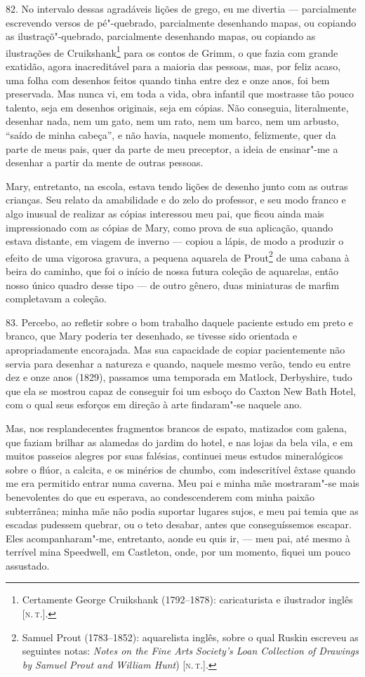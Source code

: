 82. No intervalo dessas agradáveis lições de grego, eu me divertia ---
parcialmente escrevendo versos de pé"-quebrado, parcialmente desenhando
mapas, ou copiando as ilustraçõ"-quebrado, parcialmente desenhando mapas,
ou copiando as
ilustrações
de Cruikshank\footnote{Certamente George Cruikshank (1792--1878):
  caricaturista e ilustrador inglês {[}\textsc{n.\,t.}{]}.} para os contos de
Grimm, o que fazia com grande exatidão, agora inacreditável para a
maioria das pessoas, mas, por feliz acaso, uma folha com desenhos feitos
quando tinha entre dez e onze anos, foi bem preservada. Mas nunca vi, em
toda a vida, obra infantil que mostrasse tão pouco talento, seja em
desenhos originais, seja em cópias. Não conseguia, literalmente,
desenhar nada, nem um gato, nem um rato, nem um barco, nem um arbusto,
``saído de minha cabeça'', e não havia, naquele momento, felizmente,
quer da parte de meus pais, quer da parte de meu preceptor, a ideia de
ensinar"-me a desenhar a partir da mente de outras pessoas.

Mary, entretanto, na escola, estava tendo lições de desenho junto com as
outras crianças. Seu relato da amabilidade e do zelo do professor, e seu
modo franco e algo inusual de realizar as cópias interessou meu pai, que
ficou ainda mais impressionado com as cópias de Mary, como prova de sua
aplicação, quando estava distante, em viagem de inverno --- copiou a
lápis, de modo a produzir o efeito de uma vigorosa gravura, a pequena
aquarela de Prout\footnote{Samuel Prout (1783--1852): aquarelista inglês,
  sobre o qual Ruskin escreveu as seguintes notas: \emph{Notes on the
  Fine Arts} \emph{Society's Loan Collection of Drawings by Samuel Prout
  and William Hunt}) {[}\textsc{n.\,t.}{]}.} de uma cabana à beira do caminho,
que foi o início de nossa futura coleção de aquarelas, então nosso único
quadro desse tipo --- de outro gênero, duas miniaturas de marfim
completavam a coleção.

83. Percebo, ao refletir sobre o bom trabalho daquele paciente estudo em
preto e branco, que Mary poderia ter desenhado, se tivesse sido
orientada e apropriadamente encorajada. Mas sua capacidade de copiar
pacientemente não servia para desenhar a natureza e quando, naquele
mesmo verão, tendo eu entre dez e onze anos (1829), passamos uma
temporada em Matlock, Derbyshire, tudo que ela se mostrou capaz de
conseguir foi um esboço do Caxton New Bath Hotel, com o qual seus
esforços em direção à arte findaram"-se naquele ano.

Mas, nos resplandecentes fragmentos brancos de espato, matizados com
galena, que faziam brilhar as alamedas do jardim do hotel, e nas lojas
da bela vila, e em muitos passeios alegres por suas falésias, continuei
meus estudos mineralógicos sobre o flúor, a calcita, e os minérios de
chumbo, com indescritível êxtase quando me era permitido entrar numa
caverna. Meu pai e minha mãe mostraram"-se mais benevolentes do que eu
esperava, ao condescenderem com minha paixão subterrânea; minha mãe não
podia suportar lugares sujos, e meu pai temia que as escadas pudessem
quebrar, ou o teto desabar, antes que conseguíssemos escapar. Eles
acompanharam"-me, entretanto, aonde eu quis ir, --- meu pai, até mesmo à
terrível mina Speedwell, em Castleton, onde, por um momento, fiquei um
pouco assustado.


